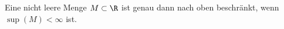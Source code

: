 \begin{exercise}
  Eine nicht leere Menge $M \subset \R$ ist genau dann nach oben beschränkt,
  wenn $\sup(M) < \infty$ ist.
\end{exercise}

